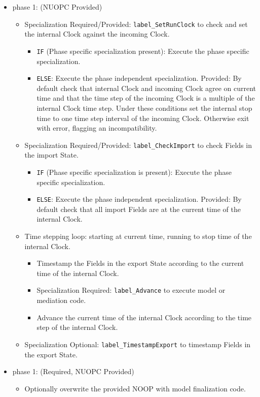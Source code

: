 \begin{itemize}
\item phase 1: ({\sc NUOPC Provided})
  \begin{itemize}
  \item {\sc Specialization Required/Provided}: {\tt label\_SetRunClock} to check and set the internal Clock against the incoming Clock.
  \begin{itemize}
  \item {\tt IF} (Phase specific specialization present): Execute the phase specific specialization.
  \item {\tt ELSE}: Execute the phase independent specialization. {\sc Provided}: By default check that internal Clock and incoming Clock agree on current time and that the time step of the incoming Clock is a multiple of the internal Clock time step. Under these conditions set the internal stop time to one time step interval of the incoming Clock. Otherwise exit with error, flagging an incompatibility.
  \end{itemize}
  \item {\sc Specialization Required/Provided}: {\tt label\_CheckImport} to check Fields in the import State.
  \begin{itemize}
  \item {\tt IF} (Phase specific specialization is present): Execute the phase specific specialization.
  \item {\tt ELSE}: Execute the phase independent specialization. {\sc Provided}: By default check that all import Fields are at the current time of the internal Clock.
  \end{itemize}
  \item Time stepping loop: starting at current time, running to stop time of the internal Clock.
  \begin{itemize}
  \item Timestamp the Fields in the export State according to the current time of the internal Clock.
  \item {\sc Specialization Required}: {\tt label\_Advance} to execute model or mediation code.
  \item Advance the current time of the internal Clock according to the time step of the internal Clock.
  \end{itemize}
  \item {\sc Specialization Optional}: {\tt label\_TimestampExport} to timestamp Fields in the export State.
  \end{itemize}    
\end{itemize}

\begin{itemize}
\item phase 1: ({\sc Required, NUOPC Provided})
  \begin{itemize}
  \item Optionally overwrite the provided NOOP with model finalization code.
  \end{itemize}      
\end{itemize}

\mbox{}\hrulefill\ 


